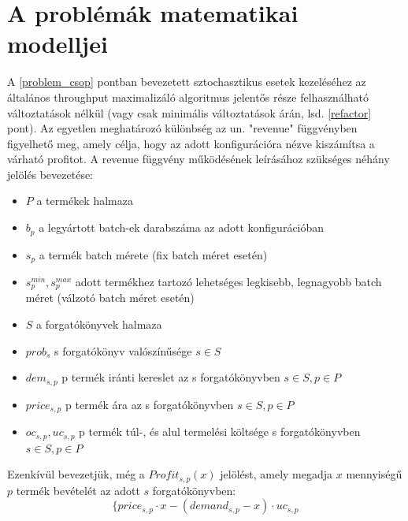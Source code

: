 \documentclass [12pt]{report}
\begin{document}
\section{A problémák matematikai modelljei} \label{math_modells}
A \ref{problem_csop} pontban bevezetett sztochasztikus esetek kezeléséhez az általános throughput maximalizáló algoritmus jelentős része felhasználható változtatások nélkül (vagy csak minimális változtatások árán, lsd. \ref{refactor} pont). Az egyetlen meghatározó különbség az un. "revenue" függvényben figyelhető meg, amely célja, hogy az adott konfigurációra nézve kiszámítsa a várható profitot. A revenue függvény működésének leírásához szükséges néhány jelölés bevezetése:
\begin {itemize}
\item[] $P$ a termékek halmaza
\item[] $b_p$ a legyártott batch-ek darabszáma az adott konfigurációban
\item[] $s_p$ a termék batch mérete (fix batch méret esetén)
\item[] $s_p^{min},s_p^{max}$ adott termékhez tartozó lehetséges legkisebb, legnagyobb batch méret (válzotó batch méret esetén)
\item[] $S$ a forgatókönyvek halmaza
\item[] $prob_s$ s forgatókönyv valószínűsége $s	\in S$
\item[] $dem_{s,p}$ p termék iránti kereslet az s forgatókönyvben $s	\in S, p	\in P$
\item[] $price_{s,p}$ p termék ára az s forgatókönyvben $s	\in S, p	\in P$
\item[] $oc_{s,p}, uc_{s,p}$ p termék túl-, és alul termelési költsége s forgatókönyvben $s	\in S, p	\in P$
\end {itemize}
Ezenkívül bevezetjük, még a $Profit_{s,p}(x)$ jelölést, amely megadja $x$ mennyiségű $p$ termék bevételét az adott $s$ forgatókönyvben:
$$\{price_{s,p}\cdot x-(demand_{s,p}-x) \cdot uc_{s,p} $$
\end{document}
